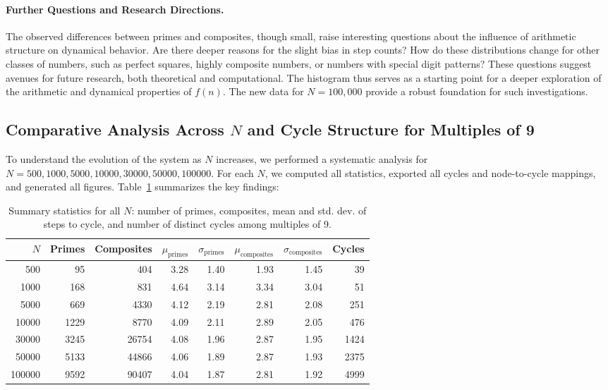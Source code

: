 \documentclass[12pt]{article}
\begin{document}
\paragraph{Further Questions and Research Directions.} The observed differences between primes and composites, though small, raise interesting questions about the influence of arithmetic structure on dynamical behavior. Are there deeper reasons for the slight bias in step counts? How do these distributions change for other classes of numbers, such as perfect squares, highly composite numbers, or numbers with special digit patterns? These questions suggest avenues for future research, both theoretical and computational. The histogram thus serves as a starting point for a deeper exploration of the arithmetic and dynamical properties of $f(n)$. The new data for $N=100,000$ provide a robust foundation for such investigations.

\subsection{Comparative Analysis Across $N$ and Cycle Structure for Multiples of 9}

To understand the evolution of the system as $N$ increases, we performed a systematic analysis for $N = 500, 1000, 5000, 10000, 30000, 50000, 100000$. For each $N$, we computed all statistics, exported all cycles and node-to-cycle mappings, and generated all figures. Table~\ref{tab:summary_stats} summarizes the key findings:

\begin{table}[H]
\centering
\begin{tabular}{r|r|r|r|r|r|r|r}
\toprule
$N$ & Primes & Composites & $\mu_\text{primes}$ & $\sigma_\text{primes}$ & $\mu_\text{composites}$ & $\sigma_\text{composites}$ & Cycles \\
\midrule
500 & 95 & 404 & 3.28 & 1.40 & 1.93 & 1.45 & 39 \\
1000 & 168 & 831 & 4.64 & 3.14 & 3.34 & 3.04 & 51 \\
5000 & 669 & 4330 & 4.12 & 2.19 & 2.81 & 2.08 & 251 \\
10000 & 1229 & 8770 & 4.09 & 2.11 & 2.89 & 2.05 & 476 \\
30000 & 3245 & 26754 & 4.08 & 1.96 & 2.87 & 1.95 & 1424 \\
50000 & 5133 & 44866 & 4.06 & 1.89 & 2.87 & 1.93 & 2375 \\
100000 & 9592 & 90407 & 4.04 & 1.87 & 2.81 & 1.92 & 4999 \\
\bottomrule
\end{tabular}
\caption{Summary statistics for all $N$: number of primes, composites, mean and std. dev. of steps to cycle, and number of distinct cycles among multiples of 9.}
\label{tab:summary_stats}
\end{table}
\end{document}

